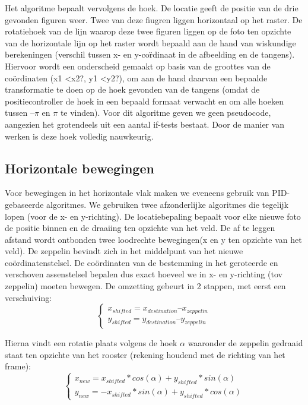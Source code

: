 \documentclass[eind]{penoverslag}
\begin{document}
Het algoritme bepaalt vervolgens de hoek. De locatie geeft de positie van de drie gevonden figuren weer. Twee van deze fiugren liggen horizontaal op het raster. De rotatiehoek van de lijn waarop deze twee figuren liggen op de foto ten opzichte van de horizontale lijn op het raster wordt bepaald aan de hand van wiskundige berekeningen (verschil tussen x- en y-co\"rdinaat in de afbeelding en de tangens).\\

Hiervoor wordt een onderscheid gemaakt op basis van de groottes van de coördinaten (x1 \textless  x2?, y1 \textless  y2?), om aan de hand daarvan een bepaalde transformatie te doen op de hoek gevonden van de tangens (omdat de positiecontroller de hoek in een bepaald formaat verwacht en om alle hoeken tussen $–\pi$ en $\pi$ te vinden). Voor dit algoritme geven we geen pseudocode, aangezien het grotendeels uit een aantal if-tests bestaat. Door de manier van werken is deze hoek volledig nauwkeurig.

\subsection{Horizontale bewegingen}
Voor bewegingen in het horizontale vlak maken we eveneens gebruik van PID-gebaseerde algoritmes. We gebruiken twee afzonderlijke algoritmes die tegelijk lopen (voor de x- en y-richting). De locatiebepaling bepaalt voor elke nieuwe foto de positie binnen en de draaiing ten opzichte van het veld. De af te leggen afstand wordt ontbonden twee loodrechte bewegingen(x en y ten opzichte van het veld). De zeppelin bevindt zich in het middelpunt van het nieuwe co\"ordinatenstelsel. De co\"{o}rdinaten van de bestemming in het geroteerde en verschoven assenstelsel bepalen dus exact hoeveel we in x- en y-richting (tov zeppelin) moeten bewegen. De omzetting gebeurt in 2 stappen, met eerst een verschuiving:
\begin{equation}
 \begin{cases}
  x_{shifted} = x_{destination} – x_{zeppelin}\\
  y_{shifted} = y_{destination} – y_{zeppelin}
 \end{cases}
\end{equation}



Hierna vindt een rotatie plaats volgens de hoek $\alpha$ waaronder de zeppelin gedraaid staat ten opzichte van het rooster (rekening houdend met de richting van het frame):
\begin{equation}
 \begin{cases}
 x_{new} = x_{shifted}*cos(\alpha) + y_{shifted}*sin(\alpha)\\
y_{new} = -x_{shifted}*sin(\alpha) + y_{shifted}*cos(\alpha)
 \end{cases}
\end{equation}
\end{document}
